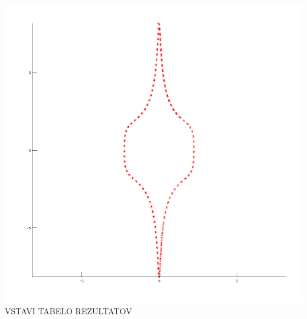 \documentclass[]{article}
\begin{document}
	\includegraphics[scale=0.3]{primer4_3}
	VSTAVI TABELO REZULTATOV\\ \\
\end{document}
